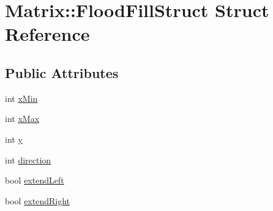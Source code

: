 \hypertarget{structMatrix_1_1FloodFillStruct}{
\section{Matrix::FloodFillStruct Struct Reference}
\label{structMatrix_1_1FloodFillStruct}
}
\subsection*{Public Attributes}
\begin{DoxyCompactItemize}
\item 
int \hyperlink{structMatrix_1_1FloodFillStruct_a1fdc18f462079d7272674bcd17a59a1c}{xMin}
\item 
int \hyperlink{structMatrix_1_1FloodFillStruct_aa43e2397f58d8185c7a144aa08da5fa7}{xMax}
\item 
int \hyperlink{structMatrix_1_1FloodFillStruct_a89c4b7add321ddfb548e9caa0d97cb10}{y}
\item 
int \hyperlink{structMatrix_1_1FloodFillStruct_ac2032c72860e9fa52c78bf95656a2811}{direction}
\item 
bool \hyperlink{structMatrix_1_1FloodFillStruct_a016d54b419c9795dad0963fde6ca265c}{extendLeft}
\item 
bool \hyperlink{structMatrix_1_1FloodFillStruct_a21709c60c2ce857ba0d589cb61c3ac40}{extendRight}
\end{DoxyCompactItemize}


